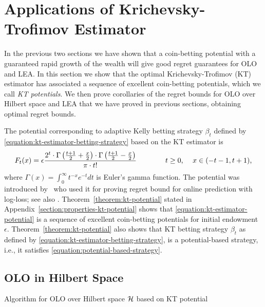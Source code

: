 \section{Applications of Krichevsky-Trofimov Estimator}
\label{section:kt-estimator}

In the previous two sections we have shown that a coin-betting potential with a
guaranteed rapid growth of the wealth will give good regret guarantees for
\ac{OLO} and \ac{LEA}. In this section we show that the optimal
Krichevsky-Trofimov (KT) estimator has associated a sequence of excellent
coin-betting potentials, which we call \emph{KT potentials}. We then prove
corollaries of the regret bounds for \ac{OLO} over Hilbert space and \ac{LEA}
that we have proved in previous sections, obtaining optimal regret bounds.

The potential corresponding to adaptive Kelly betting strategy
$\beta_t$ defined by \eqref{equation:kt-estimator-betting-strategy}
based on the KT estimator is
\begin{equation}
\label{equation:kt-estimator-potential}
F_t(x) = \epsilon \frac{2^t \cdot \Gamma \left( \frac{t+1}{2} + \frac{x}{2} \right) \cdot \Gamma \left( \frac{t+1}{2} - \frac{x}{2} \right)}{\pi \cdot t!}
\qquad \qquad \text{$t \ge 0$, \quad $x \in \left(-t-1, t+1\right)$,}
\end{equation}
where $\Gamma(x) = \int_0^\infty t^{-x} e^{-t} dt$ is Euler's gamma function.
The potential was introduced by~\citet{KrichevskyT81} who used it for proving
regret bound for online prediction with log-loss; see also \cite[Section
9.7]{Cesa-BianchiL06}.
Theorem~\ref{theorem:kt-potential} stated in
Appendix~\ref{section:properties-kt-potential} shows that
\eqref{equation:kt-estimator-potential} is a sequence of excellent coin-betting
potentials for initial endowment $\epsilon$. Theorem~\ref{theorem:kt-potential}
also shows that KT betting strategy $\beta_t$ as defined by
\eqref{equation:kt-estimator-betting-strategy}, is a potential-based strategy,
i.e., it satisfies \eqref{equation:potential-based-strategy}.

\subsection{OLO in Hilbert Space}
\label{sec:kt-olo}

\begin{algorithm}[t]
\caption{Algorithm for OLO over Hilbert space $\mathcal{H}$ based on KT potential
\label{algorithm:kt-hilbert-space-olo}}
\begin{algorithmic}
{
\ENDFOR
}
\end{algorithmic}
\end{algorithm}

